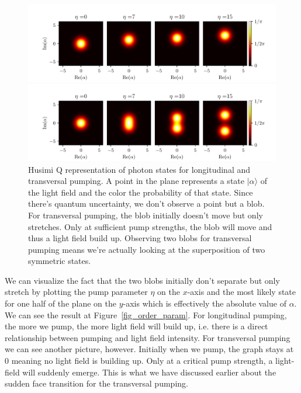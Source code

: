 \begin{figure}[!htb]
	\begin{minipage}[b]{1\linewidth}
	\centering
	\includegraphics[width=1\textwidth]{images/qfunc_long.pdf}
	\end{minipage}
%
	\begin{minipage}[b]{1\linewidth}
	\centering
	\includegraphics[width=1\textwidth]{images/qfunc_trans.pdf}
	\end{minipage}
\caption{Husimi Q representation of photon states for longitudinal and transversal pumping. A point in the plane represents a state $| \alpha \rangle$ of the light field and the color the probability of that state. Since there's quantum uncertainty, we don't observe a point but a blob. For transversal pumping, the blob initially doesn't move but only stretches. Only at sufficient pump strengths, the blob will move and thus a light field build up. Observing two blobs for transversal pumping means we're actually looking at the superposition of two symmetric states.}
\label{qfunc}
\end{figure}
\FloatBarrier

\noindent We can visualize the fact that the two blobs initially don't separate but only stretch by plotting the pump parameter $\eta$ on the $x$-axis and the most likely state for one half of the plane on the $y$-axis which is effectively the absolute value of $\alpha$. We can see the result at Figure~\ref{fig_order_param}. For longitudinal pumping, the more we pump, the more light field will build up, i.e. there is a direct relationship between pumping and light field intensity. For transversal pumping we can see another picture, however. Initially when we pump, the graph stays at 0 meaning no light field is building up. Only at a critical pump strength, a light-field will suddenly emerge. This is what we have discussed earlier about the sudden face transition for the transversal pumping.

